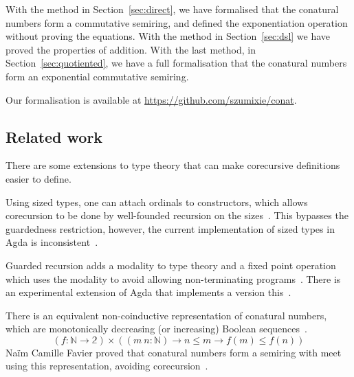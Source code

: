 With the method in Section~\ref{sec:direct}, we have formalised that the
conatural numbers form a commutative semiring, and defined the exponentiation
operation without proving the equations. With the method in
Section~\ref{sec:dsl} we have proved the properties of addition. With the last
method, in Section~\ref{sec:quotiented}, we have a full formalisation that the
conatural numbers form an exponential commutative semiring.

Our formalisation is available at \url{https://github.com/szumixie/conat}.

\subsection{Related work}

There are some extensions to type theory that can make corecursive definitions
easier to define.

Using sized types, one can attach ordinals to constructors, which allows
corecursion to be done by well-founded recursion on the
sizes~\cite{hughes-sized, abel-delay}. This bypasses the guardedness
restriction, however, the current implementation of sized types in Agda is
inconsistent~\cite{abel-agda-sized}.

Guarded recursion adds a modality to type theory and a fixed point operation
which uses the modality to avoid allowing non-terminating
programs~\cite{nakano-modality,atkey-productive}. There is an experimental
extension of Agda that implements a version this~\cite{agda-pi-calculus}.

There is an equivalent non-coinductive representation of conatural numbers,
which are monotonically decreasing (or increasing) Boolean
sequences~\cite{escardo-infinite}.
\[
  (f : \mathbb{N} \to \mathbb{2}) \times ((m\ n : \mathbb{N}) \to n \le m \to f(m) \le f(n))
\]
Naïm Camille Favier proved that conatural numbers form a semiring with meet
using this representation, avoiding corecursion~\cite{favier-conat}.
